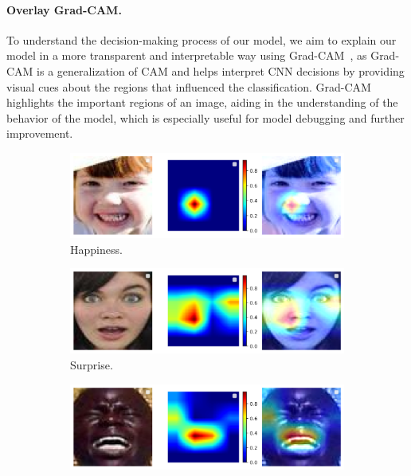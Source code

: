 \paragraph{Overlay Grad-CAM.}
To understand the decision-making process of our model, 
we aim to explain our model in a more transparent and interpretable way using Grad-CAM~\cite{SelvarajuCDVPB17}, 
as Grad-CAM is a generalization of CAM and helps interpret CNN decisions 
by providing visual cues about the regions that influenced the classification. 
Grad-CAM highlights the important regions of an image, 
aiding in the understanding of the behavior of the model, 
which is especially useful for model debugging and further improvement. 

\begin{figure}[ht]
  \centering
  \begin{subfigure}{0.47\linewidth}
    \includegraphics[width=\linewidth]{xai_happiness.png}
    \caption{Happiness.}
    \label{fig:xai1}
  \end{subfigure}
  \hfill
  \begin{subfigure}{0.47\linewidth}
    \includegraphics[width=\linewidth]{xai_surprise.png}
    \caption{Surprise.}
    \label{fig:xai2}
  \end{subfigure}
  \hfill
  \begin{subfigure}{0.47\linewidth}
    \includegraphics[width=\linewidth]{xai_sadness.png}

\end{subfigure}
\end{figure}
